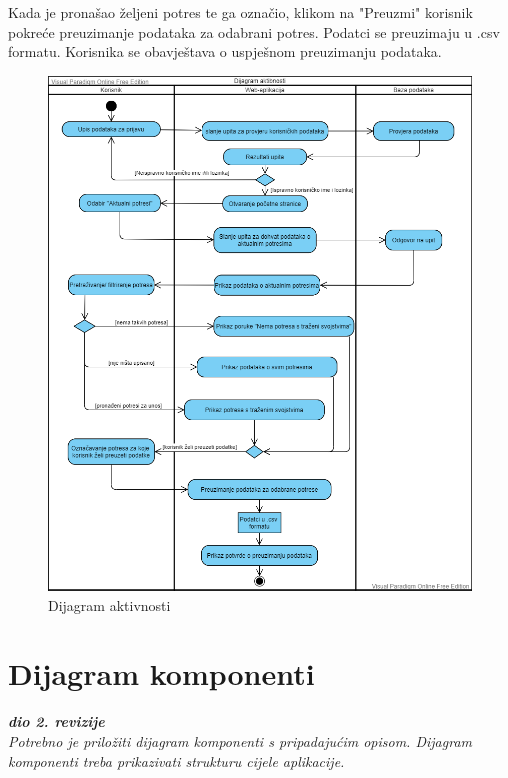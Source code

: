 		Kada je pronašao željeni potres te ga označio, klikom na "Preuzmi" korisnik pokreće preuzimanje podataka za odabrani potres. Podatci se preuzimaju u .csv formatu. Korisnika se obavještava o uspješnom preuzimanju podataka.
		
		\begin{figure}[H]
			\includegraphics[width=\textwidth]{slike/dijagram_aktivnosti.png}
			\caption{Dijagram aktivnosti}
			\label{fig:uml_db} 
		\end{figure}
		
			
			\eject
		\section{Dijagram komponenti}
		
			\textbf{\textit{dio 2. revizije}}\\
		
			 \textit{Potrebno je priložiti dijagram komponenti s pripadajućim opisom. Dijagram komponenti treba prikazivati strukturu cijele aplikacije.}
		\eject